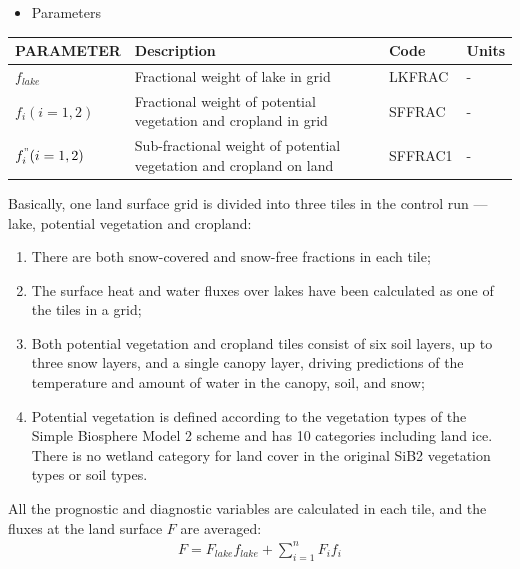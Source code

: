 \begin{itemize}
\tightlist
\item
  Parameters
\end{itemize}

\begin{landscape}

\begin{longtable}[]{@{}llll@{}}
\toprule\noalign{}
PARAMETER & Description & Code & Units \\
\midrule\noalign{}
\endhead
\bottomrule\noalign{}
\endlastfoot
\(f_{lake}\) & Fractional weight of lake in grid & LKFRAC & - \\
\(f_i(i=1,2)\) & Fractional weight of potential vegetation and cropland in grid & SFFRAC & - \\
\(f_i^"(i=1,2)\) & Sub-fractional weight of potential vegetation and cropland on land & SFFRAC1 & - \\
\end{longtable}

\end{landscape}

Basically, one land surface grid is divided into three tiles in the control run --- lake, potential vegetation and cropland:

\begin{enumerate}
\def\labelenumi{\arabic{enumi}.}
\tightlist
\item
  There are both snow-covered and snow-free fractions in each tile;
\item
  The surface heat and water fluxes over lakes have been calculated as one of the tiles in a grid;
\item
  Both potential vegetation and cropland tiles consist of six soil layers, up to three snow layers, and a single canopy layer, driving predictions of the temperature and amount of water in the canopy,
  soil, and snow;
\item
  Potential vegetation is defined according to the vegetation types of the Simple Biosphere Model 2 \citep{Sellers1996-ye} scheme and has 10 categories including land ice. There is no wetland category
  for land cover in the original SiB2 vegetation types or soil types.
\end{enumerate}

All the prognostic and diagnostic variables are calculated in each tile, and the fluxes at the land surface \(F\) are averaged: \begin{eqnarray}
F=F_{lake}f_{lake}+\sum_{i=1}^nF_if_i
\end{eqnarray}

